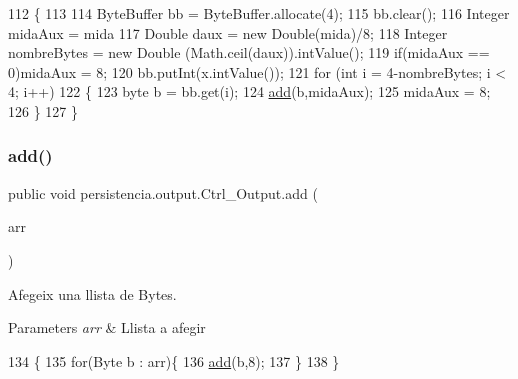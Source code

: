 \begin{DoxyCode}
112                                             \{
113 
114         ByteBuffer bb = ByteBuffer.allocate(4); 
115         bb.clear();
116         Integer midaAux = mida%
117         Double daux = \textcolor{keyword}{new} Double(mida)/8;
118         Integer nombreBytes = \textcolor{keyword}{new} Double (Math.ceil(daux)).intValue();
119         \textcolor{keywordflow}{if}(midaAux == 0)midaAux = 8;
120         bb.putInt(x.intValue());
121         \textcolor{keywordflow}{for} (\textcolor{keywordtype}{int} i = 4-nombreBytes; i < 4; i++)
122         \{
123             byte b = bb.get(i);
124             \hyperlink{classpersistencia_1_1output_1_1Ctrl__Output_a8c5aa5a6acb5259faeb1c05c71ddd21c}{add}(b,midaAux);
125             midaAux = 8;
126         \}
127     \}
\end{DoxyCode}
\mbox{\label{classpersistencia_1_1output_1_1Ctrl__Output_a5fb2f07198a77b4fac0f95ee48e3d0b9}} 
\subsubsection{\texorpdfstring{add()}{add()}\hspace{0.1cm}{\footnotesize\ttfamily [6/6]}}
{\footnotesize\ttfamily public void persistencia.\+output.\+Ctrl\+\_\+\+Output.\+add (\begin{DoxyParamCaption}\item[{Array\+List$<$ Byte $>$}]{arr }\end{DoxyParamCaption})\hspace{0.3cm}{\ttfamily [inline]}}



Afegeix una llista de Bytes. 


\begin{DoxyParams}{Parameters}
{\em arr} & Llista a afegir \\
\hline
\end{DoxyParams}

\begin{DoxyCode}
134                                         \{
135         \textcolor{keywordflow}{for}(Byte b : arr)\{
136             \hyperlink{classpersistencia_1_1output_1_1Ctrl__Output_a8c5aa5a6acb5259faeb1c05c71ddd21c}{add}(b,8);
137         \}
138     \}
\end{DoxyCode}
\mbox{\label{classpersistencia_1_1output_1_1Ctrl__Output_ad4738467c2312b0e079c14003e548dd6}} 
